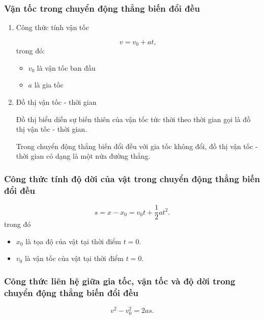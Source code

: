 \subsubsection{Vận tốc trong chuyển động thẳng biến đổi đều}
\begin{enumerate}[label=\alph*)]
	\item Công thức tính vận tốc
	
	\begin{equation}
		v=v_0+at,
	\end{equation}
trong đó:
	\begin{itemize}
		\item $v_0$ là vận tốc ban đầu 
		\item $a$ là gia tốc 
	\end{itemize}
	\item Đồ thị vận tốc - thời gian
	
	Đồ thị biểu diễn sự biến thiên của vận tốc tức thời theo thời gian gọi là đồ thị vận tốc - thời gian.
	
	Trong chuyển động thẳng biến đổi đều với gia tốc không đổi, đồ thị vận tốc - thời gian có dạng là một nửa đường thẳng.
\end{enumerate}
\subsubsection{Công thức tính độ dời của vật trong chuyển động thẳng biến đổi đều}
\begin{equation}
	s=x-x_0=v_0t+\dfrac{1}{2}at^2.
\end{equation}
 	trong đó 
 		\begin{itemize}
 			\item $x_0$ là tọa độ của vật tại thời điểm $t=0$.
 			\item $v_0$ là vận tốc của vật tại thời điểm $t=0$.
 		\end{itemize}
\subsubsection{Công thức liên hệ giữa gia tốc, vận tốc và độ dời  trong chuyển động thẳng biến đổi đều}
\begin{equation}
	v^2-v_0^2=2as.
\end{equation}


